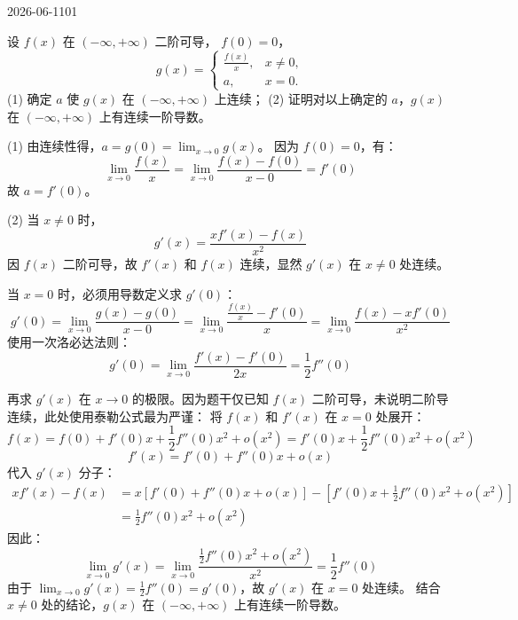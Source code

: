\begin{mistake}{2026-06-11}{01}

\begin{problemcontent}
设 \(f(x)\) 在 \((-\infty, +\infty)\) 二阶可导， \(f(0) = 0\)，
\[
g(x) = \begin{cases} \frac{f(x)}{x}, & x \neq 0, \\ a, & x = 0. \end{cases}
\]
(1) 确定 \(a\) 使 \(g(x)\) 在 \((-\infty, +\infty)\) 上连续；
(2) 证明对以上确定的 \(a\)，\(g(x)\) 在 \((-\infty, +\infty)\) 上有连续一阶导数。
\end{problemcontent}

\begin{solutioncontent}
(1) 由连续性得，\(a = g(0) = \lim_{x \to 0} g(x)\)。
因为 \(f(0) = 0\)，有：
\[
\lim_{x \to 0} \frac{f(x)}{x} = \lim_{x \to 0} \frac{f(x) - f(0)}{x - 0} = f'(0)
\]
故 \(a = f'(0)\)。

(2) 当 \(x \neq 0\) 时，
\[
g'(x) = \frac{xf'(x) - f(x)}{x^2}
\]
因 \(f(x)\) 二阶可导，故 \(f'(x)\) 和 \(f(x)\) 连续，显然 \(g'(x)\) 在 \(x \neq 0\) 处连续。

当 \(x = 0\) 时，必须用导数定义求 \(g'(0)\)：
\[
g'(0) = \lim_{x \to 0} \frac{g(x) - g(0)}{x - 0} = \lim_{x \to 0} \frac{\frac{f(x)}{x} - f'(0)}{x} = \lim_{x \to 0} \frac{f(x) - xf'(0)}{x^2}
\]
使用一次洛必达法则：
\[
g'(0) = \lim_{x \to 0} \frac{f'(x) - f'(0)}{2x} = \frac{1}{2} f''(0)
\]

再求 \(g'(x)\) 在 \(x \to 0\) 的极限。因为题干仅已知 \(f(x)\) 二阶可导，未说明二阶导连续，此处使用泰勒公式最为严谨：
将 \(f(x)\) 和 \(f'(x)\) 在 \(x=0\) 处展开：
\[
f(x) = f(0) + f'(0)x + \frac{1}{2}f''(0)x^2 + o(x^2) = f'(0)x + \frac{1}{2}f''(0)x^2 + o(x^2)
\]
\[
f'(x) = f'(0) + f''(0)x + o(x)
\]
代入 \(g'(x)\) 分子：
\[
\begin{aligned}
xf'(x) - f(x) &= x[f'(0) + f''(0)x + o(x)] - [f'(0)x + \frac{1}{2}f''(0)x^2 + o(x^2)] \\
&= \frac{1}{2}f''(0)x^2 + o(x^2)
\end{aligned}
\]
因此：
\[
\lim_{x \to 0} g'(x) = \lim_{x \to 0} \frac{\frac{1}{2}f''(0)x^2 + o(x^2)}{x^2} = \frac{1}{2}f''(0)
\]
由于 \(\lim_{x \to 0} g'(x) = \frac{1}{2}f''(0) = g'(0)\)，故 \(g'(x)\) 在 \(x=0\) 处连续。
结合 \(x \neq 0\) 处的结论，\(g(x)\) 在 \((-\infty, +\infty)\) 上有连续一阶导数。
\end{solutioncontent}


\end{mistake}
